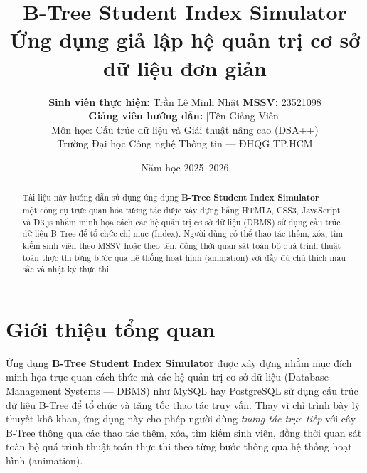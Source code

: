 \documentclass[12pt,a4paper]{article}
\begin{document}
\title{%
  \textbf{B-Tree Student Index Simulator}\\[0.4em]
  \large Ứng dụng giả lập hệ quản trị cơ sở dữ liệu đơn giản
}
\author{%
  \textbf{Sinh viên thực hiện:} Trần Lê Minh Nhật \quad \textbf{MSSV:} 23521098\\[0.3em]
  \textbf{Giảng viên hướng dẫn:} [Tên Giảng Viên]\\[0.3em]
  Môn học: Cấu trúc dữ liệu và Giải thuật nâng cao (DSA++)\\
  Trường Đại học Công nghệ Thông tin --- ĐHQG TP.HCM%
}
\date{Năm học 2025--2026}

\maketitle
\thispagestyle{empty}

\begin{abstract}
Tài liệu này hướng dẫn sử dụng ứng dụng \textbf{B-Tree Student Index Simulator}
— một công cụ trực quan hóa tương tác được xây dựng bằng HTML5, CSS3, JavaScript
và D3.js nhằm minh họa cách các hệ quản trị cơ sở dữ liệu (DBMS) sử dụng cấu trúc
dữ liệu B-Tree để tổ chức chỉ mục (Index). Người dùng có thể thao tác thêm, xóa,
tìm kiếm sinh viên theo MSSV hoặc theo tên, đồng thời quan sát toàn bộ quá trình
thuật toán thực thi từng bước qua hệ thống hoạt hình (animation) với đầy đủ chú thích
màu sắc và nhật ký thực thi.
\end{abstract}

\tableofcontents
\newpage

\section{Giới thiệu tổng quan}

Ứng dụng \textbf{B-Tree Student Index Simulator} được xây dựng nhằm mục đích minh họa trực quan cách thức mà các hệ quản trị cơ sở dữ liệu (Database Management Systems — DBMS) như MySQL hay PostgreSQL sử dụng cấu trúc dữ liệu B-Tree để tổ chức và tăng tốc thao tác truy vấn. Thay vì chỉ trình bày lý thuyết khô khan, ứng dụng này cho phép người dùng \emph{tương tác trực tiếp} với cây B-Tree thông qua các thao tác thêm, xóa, tìm kiếm sinh viên, đồng thời quan sát toàn bộ quá trình thuật toán thực thi theo từng bước thông qua hệ thống hoạt hình (animation).
\end{document}
